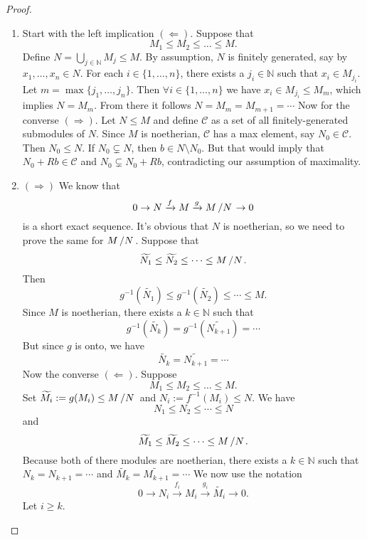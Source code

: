 \documentclass[10pt, a4paper]{article}
\newenvironment{noticeC}{%
  \tcolorbox[%
  notitle,
  empty,
  enhanced,  %
  breakable,
  coltext=black, 
  fontupper=\rmfamily,
  noparskip,
  sharp corners,
  boxrule=-1pt,  %
  frame hidden,
  left=7pt,  %
  right=7pt,
  top=5pt,
  bottom=5pt,
  before skip=2.5ex plus 2pt,
  after skip=2.5ex plus 2pt,
  overlay unbroken and last={%
  },
  ]}
{\endtcolorbox}
\newenvironment{myproof}%
  {\begin{noticeC}\begin{proof}}%
  {\end{proof}\end{noticeC}}
\newcommand{\N}{\mathbb {N}}
\newcommand{\quot}[2]{{\raisebox{0em}{$#1$}\left/\raisebox{0em}{$#2$}\right.}}
\begin{document}
\begin{myproof}
    \begin{enumerate}
        \item Start with the left implication $(\Leftarrow)$. Suppose that 
        $$M_1 \leq M_2 \leq \dots \leq M.$$ Define $N = \bigcup_{j \in \N} M_j \leq M$.
        By assumption, $N$ is finitely generated, say by $x_1, \dots, x_n \in N$.
        For each $i \in \{1, \dots, n\}$, there exists a $j_i \in \N$
        such that $x_i \in M_{j_i}$. Let $m = \max \{j_1, \dots, j_n\}$. Then $\forall i \in \{1, \dots, n\}$ 
        we have $x_i \in M_{j_i} \leq M_m$, which implies $N = M_m$. From there it follows $N = M_m = M_{m + 1} = \cdots$
        Now for the converse $(\Rightarrow)$. Let $N \leq M$ and define $\mathcal{C}$
        as a set of all finitely-generated submodules of $N$. Since $M$ is noetherian,
        $\mathcal{C}$ has a max element, say $N_0 \in \mathcal{C}$. Then $N_0 \leq N$.
        If $N_0 \subsetneq N$, then $b \in N \setminus N_0$. But that would imply that $N_0 + Rb \in \mathcal{C}$
        and $N_0 \subsetneq N_0 + Rb$, contradicting our assumption of maximality. 
        \item $(\Rightarrow)$ We know that 
        $$0 \to N \xrightarrow{f} M \xrightarrow{g} \quot{M}{N} \to 0$$
        is a short exact sequence. It's obvious that $N$ is noetherian, so we need to prove the same for $\quot{M}{N}$.
        Suppose that 
        $$\widetilde{N_1} \leq \widetilde{N_2} \leq \cdots \leq \quot{M}{N}.$$
        Then $$g^{-1} (\widetilde{N_1}) \leq g^{-1}(\widetilde{N_2}) \leq \cdots \leq M.$$
        Since $M$ is noetherian, there exists a $k \in \N$ such that 
        $$g^{-1} (\widetilde{N_k}) = g^{-1}(\widetilde{N_{k + 1}}) = \cdots$$
        But since $g$ is onto, we have 
        $$\widetilde{N_k} = \widetilde{N_{k + 1}} = \cdots$$
        Now the converse $(\Leftarrow)$. Suppose 
        $$M_1 \leq M_2 \leq \dots \leq M.$$
        Set $\widetilde{M_i} := g(M_i) \leq \quot{M}{N}$
        and $N_i := f^{-1} (M_i) \leq N$. We have 
        $$N_1 \leq N_2 \leq \cdots \leq N$$
        and $$\widetilde{M_1} \leq \widetilde{M_2} \leq \cdots \leq \quot{M}{N}.$$
        Because both of there modules are noetherian, there exists a $k \in \N$
        such that $N_k = N_{k + 1} = \cdots$ and $\widetilde{M_k} = \widetilde{M_{k + 1}} = \cdots$
        We now use the notation 
        $$0 \to N_i \xrightarrow{f_i} M_i \xrightarrow{g_i} \widetilde{M_i} \to 0.$$
        Let $i \geq k$.
        \begin{center}
\end{center}
\end{enumerate}
\end{myproof}
\end{document}
